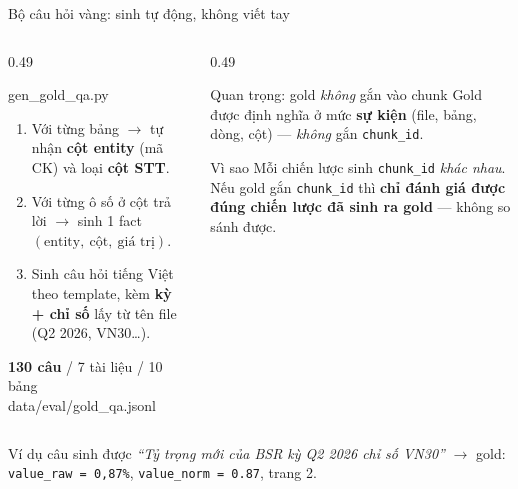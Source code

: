 \documentclass[aspectratio=169,11pt]{beamer}
\newcommand{\src}[1]{{\footnotesize\ttfamily #1}}
\begin{document}
\begin{frame}{Bộ câu hỏi vàng: sinh tự động, không viết tay}
  \begin{columns}[T]
    \begin{column}{0.49\textwidth}
      \begin{block}{\small \src{gen\_gold\_qa.py}}
        \begin{enumerate}\small
          \item Với từng bảng $\rightarrow$ tự nhận \textbf{cột entity} (mã CK) và
            loại \textbf{cột STT}.
          \item Với từng ô số ở cột trả lời $\rightarrow$ sinh 1 fact
            $(\text{entity},\ \text{cột},\ \text{giá trị})$.
          \item Sinh câu hỏi tiếng Việt theo template, kèm \textbf{kỳ + chỉ số}
            lấy từ tên file (Q2 2026, VN30\ldots).
        \end{enumerate}
        \vspace{0.2em}
        \centering \textbf{130 câu} / 7 tài liệu / 10 bảng\\
        {\footnotesize \src{data/eval/gold\_qa.jsonl}}
      \end{block}
    \end{column}
    \begin{column}{0.49\textwidth}
      \begin{alertblock}{\small Quan trọng: gold \emph{không} gắn vào chunk}
        Gold được định nghĩa ở mức \textbf{sự kiện} (file, bảng, dòng, cột) —
        \emph{không} gắn \texttt{chunk\_id}.
      \end{alertblock}
      \begin{block}{\small Vì sao}
        Mỗi chiến lược sinh \texttt{chunk\_id} \emph{khác nhau}. Nếu gold gắn
        \texttt{chunk\_id} thì \textbf{chỉ đánh giá được đúng chiến lược đã sinh ra
        gold} — không so sánh được.
      \end{block}
    \end{column}
  \end{columns}
  \vspace{0.05em}
  \begin{block}{\small Ví dụ câu sinh được}
    \small \emph{``Tỷ trọng mới của BSR kỳ Q2 2026 chỉ số VN30''}
    $\rightarrow$ gold: \texttt{value\_raw = 0,87\%}, \texttt{value\_norm = 0.87},
    trang 2.
  \end{block}
\end{frame}
\end{document}
